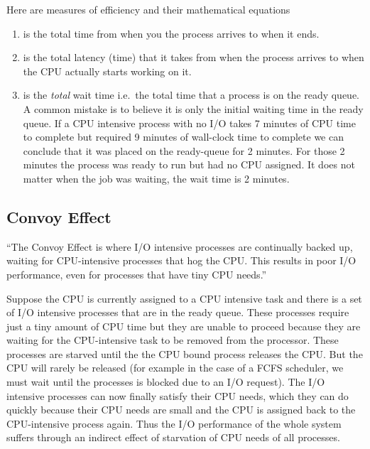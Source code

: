 Here are measures of efficiency and their mathematical equations

\begin{enumerate}
  \item {} is the total time from when you the process arrives to when it ends. 
  \item {} is the total latency (time) that it takes from when the process arrives to when the CPU actually starts working on it. 
  \item {} is the \emph{total} wait time i.e.~the total time that a process is on the ready queue. A common mistake is to believe it is only the initial waiting time in the ready queue. If a CPU intensive process with no I/O takes 7 minutes of CPU time to complete but required 9 minutes of wall-clock time to complete we can conclude that it was placed on the ready-queue for 2 minutes. For those 2 minutes the process was ready to run but had no CPU assigned. It does not matter when the job was waiting, the wait time is 2 minutes. 

\end{enumerate} 

\subsection{Convoy Effect}

``The Convoy Effect is where I/O intensive processes are continually backed up, waiting for CPU-intensive processes that hog the CPU. This results in poor I/O performance, even for processes that have tiny CPU needs.''

Suppose the CPU is currently assigned to a CPU intensive task and there is a set of I/O intensive processes that are in the ready queue. These processes require just a tiny amount of CPU time but they are unable to proceed because they are waiting for the CPU-intensive task to be removed from the processor. These processes are starved until the the CPU bound process releases the CPU. But the CPU will rarely be released (for example in the case of a FCFS scheduler, we must wait until the processes is blocked due to an I/O request). The I/O intensive processes can now finally satisfy their CPU needs, which they can do quickly because their CPU needs are small and the CPU is assigned back to the CPU-intensive process again. Thus the I/O performance of the whole system suffers through an indirect effect of starvation of CPU needs of all processes.

